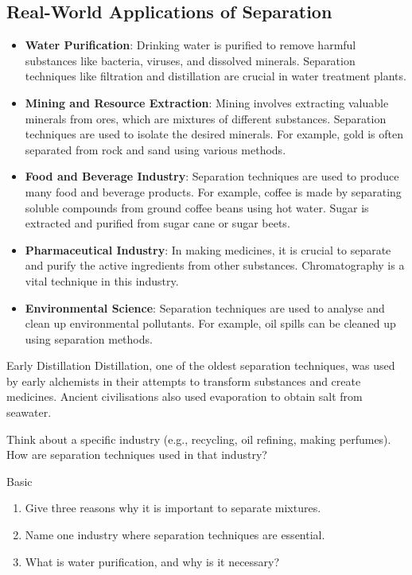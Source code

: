 \subsection{Real-World Applications of Separation}

\begin{itemize}
    \item \textbf{Water Purification}:  Drinking water is purified to remove harmful substances like bacteria, viruses, and dissolved minerals. Separation techniques like filtration and distillation are crucial in water treatment plants.
    \item \textbf{Mining and Resource Extraction}:  Mining involves extracting valuable minerals from ores, which are mixtures of different substances. Separation techniques are used to isolate the desired minerals. For example, gold is often separated from rock and sand using various methods.
    \item \textbf{Food and Beverage Industry}:  Separation techniques are used to produce many food and beverage products. For example, coffee is made by separating soluble compounds from ground coffee beans using hot water. Sugar is extracted and purified from sugar cane or sugar beets.
    \item \textbf{Pharmaceutical Industry}:  In making medicines, it is crucial to separate and purify the active ingredients from other substances. Chromatography is a vital technique in this industry.
    \item \textbf{Environmental Science}:  Separation techniques are used to analyse and clean up environmental pollutants. For example, oil spills can be cleaned up using separation methods.
\end{itemize}

\begin{historylink}{Early Distillation}
Distillation, one of the oldest separation techniques, was used by early alchemists in their attempts to transform substances and create medicines.  Ancient civilisations also used evaporation to obtain salt from seawater.
\end{historylink}

\begin{stopandthink}
Think about a specific industry (e.g., recycling, oil refining, making perfumes). How are separation techniques used in that industry?
\end{stopandthink}

\begin{tieredquestions}{Basic}
\begin{enumerate}
    \item Give three reasons why it is important to separate mixtures.
    \item Name one industry where separation techniques are essential.
    \item What is water purification, and why is it necessary?
\end{enumerate}
\end{tieredquestions}

